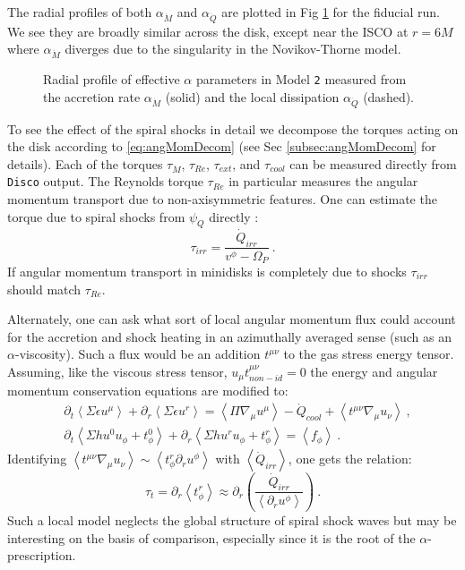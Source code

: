 \documentclass{emulateapj}
\newcommand{\al}{\alpha}
\newcommand{\eps}{\epsilon}
\newcommand{\Sig}{\Sigma}
\newcommand{\Om}{\Omega}
\newcommand{\Disco}{{\texttt{Disco}}}
\newcommand{\model}[1]{{Model \texttt{#1}}}
\newcommand{\ave}[1]{\left \langle #1 \right \rangle}
\begin{document}
The radial profiles of both $\al_{\dot{M}}$ and $\al_{\dot{Q}}$ are plotted in Fig \ref{fi:alpha} for the fiducial run.  We see they are broadly similar across the disk, except near the ISCO at $r=6M$ where $\al_{\dot{M}}$ diverges due to the singularity in the Novikov-Thorne model.

\begin{figure}
\caption{\label{fi:alpha} Radial profile of effective $\al$ parameters in \model{2} measured from the accretion rate $\al_{\dot{M}}$ (solid) and the local dissipation $\al_{\dot{Q}}$ (dashed).}
\end{figure}

To see the effect of the spiral shocks in detail we decompose the torques acting on the disk according to \eqref{eq:angMomDecom} (see Sec \ref{subsec:angMomDecom} for details). Each of the torques $\tau_{\dot{M}}$, $\tau_{Re}$, $\tau_{ext}$, and $\tau_{cool}$ can be measured directly from \Disco{} output.  The Reynolds torque $\tau_{Re}$ in particular measures the angular momentum transport due to non-axisymmetric features.  One can estimate the torque due to spiral shocks from $\psi_Q$ directly \citep{Rafikov16}:
\begin{equation}
	\tau_{irr} = \frac{\dot{Q}_{irr}}{v^\phi - \Om_P} \ . \label{eq:tauRaf}
\end{equation}
If angular momentum transport in minidisks is completely due to shocks $\tau_{irr}$ should match $\tau_{Re}$.

Alternately, one can ask what sort of local angular momentum flux could account for the accretion and shock heating in an azimuthally averaged sense (such as an $\al$-viscosity).  Such a flux would be an addition $t^{\mu\nu}$ to the gas stress energy tensor.  Assuming, like the viscous stress tensor, $u_\mu t^{\mu\nu}_{non-id} = 0$ the energy and angular momentum conservation equations are modified to:
\begin{align}
	&\partial_t \ave{\Sig \eps u^\mu} + \partial_r \ave{\Sig \eps u^r} = \ave{\Pi \nabla_\mu u^\mu} - \dot{Q}_{cool} + \ave{t^{\mu\nu} \nabla_\mu u_\nu} \ ,\\
	&\partial_t \ave{\Sig h u^0 u_\phi + t^0_\phi} + \partial_r \ave{\Sig h u^r u_\phi + t^r_\phi} = \ave{f_\phi} \ .
\end{align}
Identifying $\ave{t^{\mu\nu} \nabla_\mu u_\nu} \sim \ave{t^r_\phi \partial_r u^\phi}$ with $\ave{\dot{Q}_{irr}}$, one gets the relation:
\begin{equation}
	\tau_{t} = \partial_r \ave{t^r_\phi} \approx \partial_r \left(\frac{\dot{Q}_{irr}}{\ave{\partial_r u^\phi}} \right)\ . \label{eq:tauLoc}
\end{equation}
Such a local model neglects the global structure of spiral shock waves but may be interesting on the basis of comparison,  especially since it is the root of the $\alpha$-prescription.
\end{document}
